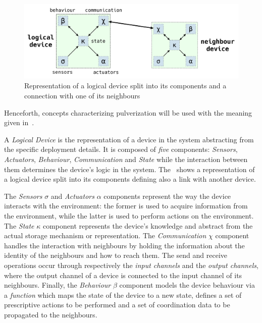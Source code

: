 \begin{figure}
	\centering
	\includegraphics[width=\textwidth]{figures/original-components-interactions.pdf}
	\caption[Logical device in the pulverization]{Representation of a logical device split into its components and a connection with one of its neighbours}
	\label{fig:logical-device}
\end{figure}

Henceforth, concepts characterizing pulverization will be used with the meaning given in~.

A \emph{Logical Device} is the representation of a device in the system abstracting from the specific deployment details.
It is composed of \emph{five} components: \emph{Sensors}, \emph{Actuators}, \emph{Behaviour}, \emph{Communication} and \emph{State} while the
interaction between them determines the device's logic in the system. The~ shows a representation of a logical device
split into its components defining also a link with another device.

The \emph{Sensors} $\sigma$ and \emph{Actuators} $\alpha$ components represent the way the device interacts with the environment: the former is used
to acquire information from the environment, while the latter is used to perform actions on the environment.
The \emph{State} $\kappa$ component represents the device's knowledge and abstract from the actual storage mechanism or representation.
The \emph{Communication} $\chi$ component handles the interaction with neighbours by holding the information about the identity of the neighbours and
how to reach them. The send and receive operations occur through respectively the \emph{input channels} and the \emph{output channels}, where the
output channel of a device is connected to the input channel of its neighbours.
Finally, the \emph{Behaviour} $\beta$ component models the device behaviour via a \emph{function} which maps the state of the device to a new state,
defines a set of prescriptive actions to be performed and a set of coordination data to be propagated to the neighbours.

